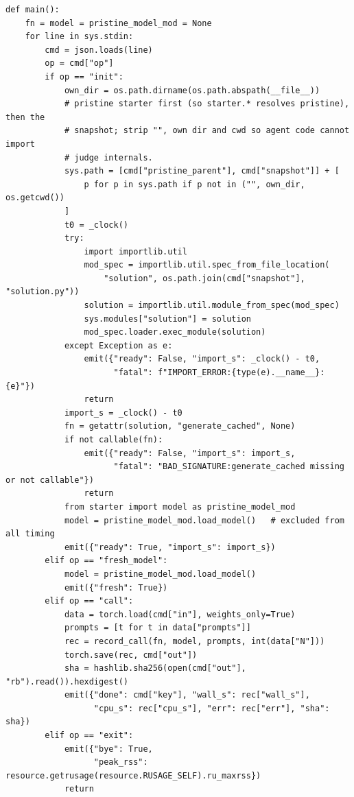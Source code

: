 \documentclass[11pt]{article}
\begin{document}
\begin{lstlisting}[style=py]
def main():
    fn = model = pristine_model_mod = None
    for line in sys.stdin:
        cmd = json.loads(line)
        op = cmd["op"]
        if op == "init":
            own_dir = os.path.dirname(os.path.abspath(__file__))
            # pristine starter first (so starter.* resolves pristine), then the
            # snapshot; strip "", own dir and cwd so agent code cannot import
            # judge internals.
            sys.path = [cmd["pristine_parent"], cmd["snapshot"]] + [
                p for p in sys.path if p not in ("", own_dir, os.getcwd())
            ]
            t0 = _clock()
            try:
                import importlib.util
                mod_spec = importlib.util.spec_from_file_location(
                    "solution", os.path.join(cmd["snapshot"], "solution.py"))
                solution = importlib.util.module_from_spec(mod_spec)
                sys.modules["solution"] = solution
                mod_spec.loader.exec_module(solution)
            except Exception as e:
                emit({"ready": False, "import_s": _clock() - t0,
                      "fatal": f"IMPORT_ERROR:{type(e).__name__}: {e}"})
                return
            import_s = _clock() - t0
            fn = getattr(solution, "generate_cached", None)
            if not callable(fn):
                emit({"ready": False, "import_s": import_s,
                      "fatal": "BAD_SIGNATURE:generate_cached missing or not callable"})
                return
            from starter import model as pristine_model_mod
            model = pristine_model_mod.load_model()   # excluded from all timing
            emit({"ready": True, "import_s": import_s})
        elif op == "fresh_model":
            model = pristine_model_mod.load_model()
            emit({"fresh": True})
        elif op == "call":
            data = torch.load(cmd["in"], weights_only=True)
            prompts = [t for t in data["prompts"]]
            rec = record_call(fn, model, prompts, int(data["N"]))
            torch.save(rec, cmd["out"])
            sha = hashlib.sha256(open(cmd["out"], "rb").read()).hexdigest()
            emit({"done": cmd["key"], "wall_s": rec["wall_s"],
                  "cpu_s": rec["cpu_s"], "err": rec["err"], "sha": sha})
        elif op == "exit":
            emit({"bye": True,
                  "peak_rss": resource.getrusage(resource.RUSAGE_SELF).ru_maxrss})
            return
\end{lstlisting}
\end{document}
